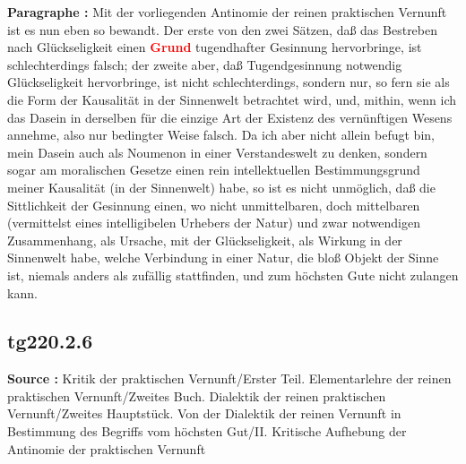 \documentclass[a4paper,12pt,twoside]{book}
\newcommand{\match}[1]{\textcolor{red}{\textbf{#1}}}
\begin{document}
	\noindent\textbf{Paragraphe : }Mit der vorliegenden Antinomie der reinen praktischen Vernunft ist es nun eben so bewandt. Der erste von den zwei Sätzen, daß das Bestreben nach Glückseligkeit einen \match{Grund} tugendhafter Gesinnung hervorbringe, ist schlechterdings falsch; der zweite aber, daß Tugendgesinnung notwendig Glückseligkeit hervorbringe, ist nicht schlechterdings, sondern nur, so fern sie als die Form der Kausalität in der Sinnenwelt betrachtet wird, und, mithin, wenn ich das Dasein in derselben für die einzige Art der Existenz des vernünftigen Wesens annehme, also nur bedingter Weise falsch. Da ich aber nicht allein befugt bin, mein Dasein auch als Noumenon in einer Verstandeswelt zu denken, sondern sogar am moralischen Gesetze einen rein intellektuellen Bestimmungsgrund meiner Kausalität (in der Sinnenwelt) habe, so ist es nicht unmöglich, daß die Sittlichkeit der Gesinnung einen, wo nicht unmittelbaren, doch mittelbaren (vermittelst eines intelligibelen Urhebers  der Natur) und zwar notwendigen Zusammenhang, als Ursache, mit der Glückseligkeit, als Wirkung in der Sinnenwelt habe, welche Verbindung in einer Natur, die bloß Objekt der Sinne ist, niemals anders als zufällig stattfinden, und zum höchsten Gute nicht zulangen kann. 
	
	\subsection*{tg220.2.6} 
	\textbf{Source : }Kritik der praktischen Vernunft/Erster Teil. Elementarlehre der reinen praktischen Vernunft/Zweites Buch. Dialektik der reinen praktischen Vernunft/Zweites Hauptstück. Von der Dialektik der reinen Vernunft in Bestimmung des Begriffs vom höchsten Gut/II. Kritische Aufhebung der Antinomie der praktischen Vernunft\\  
	
\end{document}
